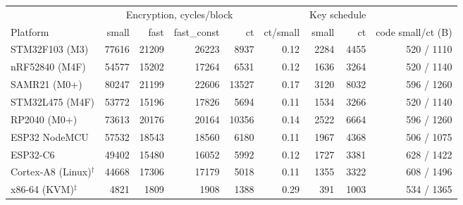 \begin{tabular}{lrrrrrrrr}
\hline
 & \multicolumn{4}{c}{Encryption, cycles/block} & & \multicolumn{2}{c}{Key schedule} & \\
Platform & small & fast & fast\_const & ct & ct/small & small & ct & code small/ct (B)\\
\hline
STM32F103 (M3) & 77616 & 21209 & 26223 & 8937 & 0.12 & 2284 & 4455 & 520 / 1110\\
nRF52840 (M4F) & 54577 & 15202 & 17264 & 6531 & 0.12 & 1636 & 3264 & 520 / 1140\\
SAMR21 (M0+) & 80247 & 21199 & 22606 & 13527 & 0.17 & 3120 & 8032 & 596 / 1260\\
STM32L475 (M4F) & 53772 & 15196 & 17826 & 5694 & 0.11 & 1534 & 3266 & 520 / 1140\\
RP2040 (M0+) & 73613 & 20176 & 20164 & 10356 & 0.14 & 2522 & 6664 & 596 / 1260\\
ESP32 NodeMCU & 57532 & 18543 & 18560 & 6180 & 0.11 & 1967 & 4368 & 506 / 1075\\
ESP32-C6 & 49402 & 15480 & 16052 & 5992 & 0.12 & 1727 & 3381 & 628 / 1422\\
Cortex-A8 (Linux)$^{\dagger}$ & 44668 & 17306 & 17179 & 5018 & 0.11 & 1355 & 3322 & 608 / 1496\\
x86-64 (KVM)$^{\ddagger}$ & 4821 & 1809 & 1908 & 1388 & 0.29 & 391 & 1003 & 534 / 1365\\
\hline
\end{tabular}
